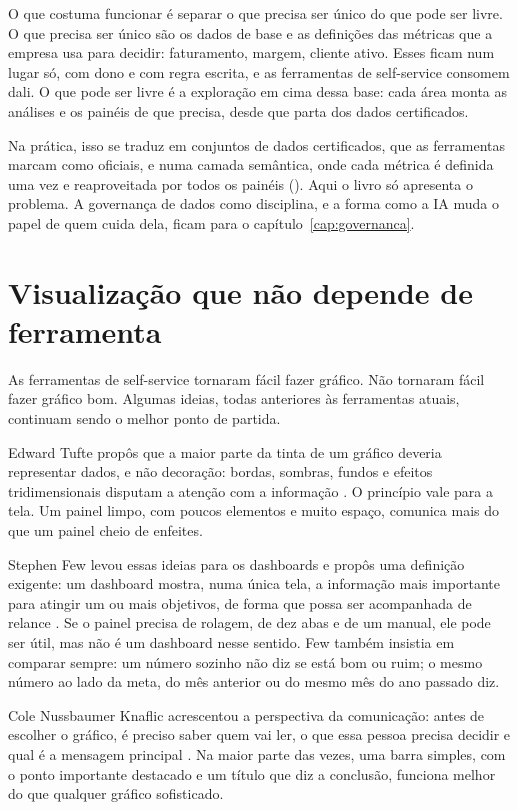 O que costuma funcionar é separar o que precisa ser único do que pode ser livre. O que
precisa ser único são os dados de base e as definições das métricas que a empresa usa
para decidir: faturamento, margem, cliente ativo. Esses ficam num lugar só, com dono e
com regra escrita, e as ferramentas de self-service consomem dali. O que pode ser livre é
a exploração em cima dessa base: cada área monta as análises e os painéis de que
precisa, desde que parta dos dados certificados.

Na prática, isso se traduz em conjuntos de dados certificados, que as ferramentas
marcam como oficiais, e numa camada semântica, onde cada métrica é definida uma vez e
reaproveitada por todos os painéis (). Aqui o livro só
apresenta o problema. A governança de dados como disciplina, e a forma como a IA muda o
papel de quem cuida dela, ficam para o capítulo~\ref{cap:governanca}.

\section{Visualização que não depende de ferramenta}
\label{sec:visualizacao}

As ferramentas de self-service tornaram fácil fazer gráfico. Não tornaram fácil fazer
gráfico bom. Algumas ideias, todas anteriores às ferramentas atuais, continuam sendo o
melhor ponto de partida.

Edward Tufte propôs que a maior parte da tinta de um gráfico deveria representar dados,
e não decoração: bordas, sombras, fundos e efeitos tridimensionais disputam a atenção
com a informação \parencite{tufte1983}. O princípio vale para a tela. Um painel limpo,
com poucos elementos e muito espaço, comunica mais do que um painel cheio de enfeites.

Stephen Few levou essas ideias para os dashboards e propôs uma definição exigente: um
dashboard mostra, numa única tela, a informação mais importante para atingir um ou mais
objetivos, de forma que possa ser acompanhada de relance \parencite{few2006}. Se o painel
precisa de rolagem, de dez abas e de um manual, ele pode ser útil, mas não é um
dashboard nesse sentido. Few também insistia em comparar sempre: um número sozinho não
diz se está bom ou ruim; o mesmo número ao lado da meta, do mês anterior ou do mesmo mês
do ano passado diz.

Cole Nussbaumer Knaflic acrescentou a perspectiva da comunicação: antes de escolher o
gráfico, é preciso saber quem vai ler, o que essa pessoa precisa decidir e qual é a
mensagem principal \parencite{knaflic2015}. Na maior parte das vezes, uma barra simples,
com o ponto importante destacado e um título que diz a conclusão, funciona melhor do que
qualquer gráfico sofisticado.

